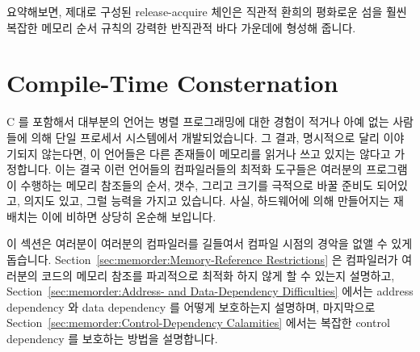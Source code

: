 요약해보면, 제대로 구성된 release-acquire 체인은 직관적 환희의 평화로운 섬을
훨씬 복잡한 메모리 순서 규칙의 강력한 반직관적 바다 가운데에 형성해 줍니다.

\section{Compile-Time Consternation}
\label{sec:memorder:Compile-Time Consternation}

C 를 포함해서 대부분의 언어는 병렬 프로그래밍에 대한 경험이 적거나 아예 없는
사람들에 의해 단일 프로세서 시스템에서 개발되었습니다.
그 결과, 명시적으로 달리 이야기되지 않는다면, 이 언어들은 다른 존재들이
메모리를 읽거나 쓰고 있지는 않다고 가정합니다.
이는 결국 이런 언어들의 컴파일러들의 최적화 도구들은 여러분의 프로그램이
수행하는 메모리 참조들의 순서, 갯수, 그리고 크기를 극적으로 바꿀 준비도
되어있고, 의지도 있고, 그럴 능력을 가지고 있습니다.
사실, 하드웨어에 의해 만들어지는 재배치는 이에 비하면 상당히 온순해 보입니다.

이 섹션은 여러분이 여러분의 컴파일러를 길들여서 컴파일 시점의 경악을 없앨 수
있게 돕습니다.
Section~\ref{sec:memorder:Memory-Reference Restrictions}
은 컴파일러가 여러분의 코드의 메모리 참조를 파괴적으로 최적화 하지 않게 할 수
있는지 설명하고,
Section~\ref{sec:memorder:Address- and Data-Dependency Difficulties}
에서는 address dependency 와 data dependency 를 어떻게 보호하는지 설명하며,
마지막으로
Section~\ref{sec:memorder:Control-Dependency Calamities}
에서는 복잡한 control dependency 를 보호하는 방법을 설명합니다.


